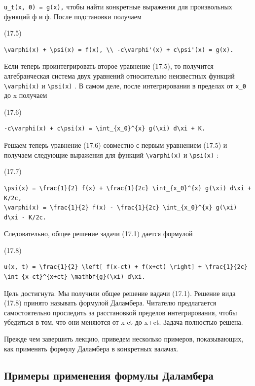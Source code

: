 \documentclass[
  ukrainian,
]{article}
\begin{document}
\texttt{u\_t(x,\ 0)\ =\ g(x),} чтобы найти конкретные выражения для
произвольных функций ф и ф. После подстановки получаем

(17.5)

\begin{verbatim}
\varphi(x) + \psi(x) = f(x), \\ -c\varphi'(x) + c\psi'(x) = g(x).
\end{verbatim}

Если теперь проинтегрировать второе уравнение (17.5), то получится
алгебранческая система двух уравнений относительно неизвестных функций
\texttt{\textbackslash{}varphi(x)} и \texttt{\textbackslash{}psi(x)} . В
самом деле, после интегрирования в пределах от \texttt{x\_0} до x
получаем

(17.6)

\begin{verbatim}
-c\varphi(x) + c\psi(x) = \int_{x_0}^{x} g(\xi) d\xi + K.
\end{verbatim}

Решаем теперь уравнение (17.6) совместно с первым уравнением (17.5) и
получаем следующие выражения для функций
\texttt{\textbackslash{}varphi(x)} и \texttt{\textbackslash{}psi(x)} :

(17.7)

\begin{verbatim}
\psi(x) = \frac{1}{2} f(x) + \frac{1}{2c} \int_{x_0}^{x} g(\xi) d\xi + K/2c,
\varphi(x) = \frac{1}{2} f(x) - \frac{1}{2c} \int_{x_0}^{x} g(\xi) d\xi - K/2c.
\end{verbatim}

Следовательно, общее решение задачи (17.1) дается формулой

(17.8)

\begin{verbatim}
u(x, t) = \frac{1}{2} \left[ f(x-ct) + f(x+ct) \right] + \frac{1}{2c} \int_{x-ct}^{x+ct} \mathbf{g}(\xi) d\xi.
\end{verbatim}

Цель достигнута. Мы получили общее решение вадачи (17.1). Решение вида
(17.8) принято называть формулой Даламбера. Читателю предлагается
самостоятельно проследить за расстановкой пределов интегрирования, чтобы
убедиться в том, что они меняются от x-ct до x+ct. Задача полностью
решена.

Прежде чем завершить лекцию, приведем несколько примеров, показывающих,
как применять формулу Даламбера в конкретных валачах.

\subsection{Примеры применения формулы
Даламбера}\label{ux43fux440ux438ux43cux435ux440ux44b-ux43fux440ux438ux43cux435ux43dux435ux43dux438ux44f-ux444ux43eux440ux43cux443ux43bux44b-ux434ux430ux43bux430ux43cux431ux435ux440ux430}
\end{document}
